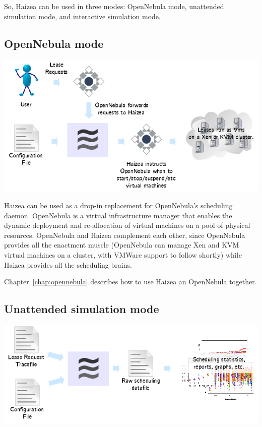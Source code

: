 So, Haizea can be used in three modes: OpenNebula mode, unattended simulation mode, and interactive simulation mode.

\subsection{OpenNebula mode}

\begin{center}
\includegraphics{images/mode_opennebula.png}
\end{center}

Haizea can be used as a drop-in replacement for OpenNebula's scheduling daemon. OpenNebula is a virtual infrastructure manager that enables the dynamic deployment and re-allocation of virtual machines on a pool of physical resources. OpenNebula and Haizea complement each other, since OpenNebula provides all the enactment muscle (OpenNebula can manage Xen and KVM virtual machines on a cluster, with VMWare support to follow shortly) while Haizea provides all the scheduling brains. 

Chapter~\ref{chap:opennebula} describes how to use Haizea an OpenNebula together.

\subsection{Unattended simulation mode}

\begin{center}
\includegraphics{images/mode_unattended_simulation.png}
\end{center}

